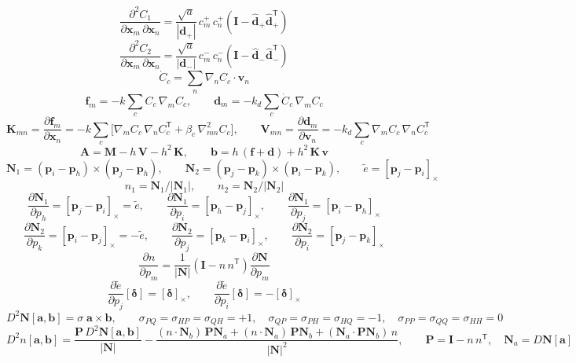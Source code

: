 \[ \frac{\partial^2 C_{1}}{\partial \mathbf{x}_m\,\partial \mathbf{x}_n} = \frac{\sqrt{a}}{|\mathbf{d}_{+}|}\,c^{{+}}_{m}\,c^{{+}}_{n}\left(\mathbf{I} - \hat{\mathbf{d}}_{+}\hat{\mathbf{d}}_{+}^{\mathsf T}\right) \]
\[ \frac{\partial^2 C_{2}}{\partial \mathbf{x}_m\,\partial \mathbf{x}_n} = \frac{\sqrt{a}}{|\mathbf{d}_{-}|}\,c^{{-}}_{m}\,c^{{-}}_{n}\left(\mathbf{I} - \hat{\mathbf{d}}_{-}\hat{\mathbf{d}}_{-}^{\mathsf T}\right) \]
\[ \dot C_c = \sum_n \nabla_n C_c\cdot\mathbf{v}_n \]
\[ \mathbf{f}_m = -k\sum_c C_c\,\nabla_m C_c,\qquad \mathbf{d}_m = -k_d\sum_c \dot C_c\,\nabla_m C_c \]
\[ \mathbf{K}_{mn} = \frac{\partial \mathbf{f}_m}{\partial \mathbf{x}_n} = -k\sum_c\Big[\nabla_m C_c\,\nabla_n C_c^{\mathsf T} + \beta_c\,\nabla^2_{mn} C_c\Big],\qquad \mathbf{V}_{mn} = \frac{\partial \mathbf{d}_m}{\partial \mathbf{v}_n} = -k_d\sum_c \nabla_m C_c\,\nabla_n C_c^{\mathsf T} \]
\[ \mathbf{A} = \mathbf{M} - h\,\mathbf{V} - h^2\,\mathbf{K},\qquad \mathbf{b} = h\,(\mathbf{f} + \mathbf{d}) + h^2\,\mathbf{K}\,\mathbf{v} \]
\[ \mathbf{N}_1 = (\mathbf{p}_i - \mathbf{p}_h)\times(\mathbf{p}_j - \mathbf{p}_h),\qquad \mathbf{N}_2 = (\mathbf{p}_j - \mathbf{p}_k)\times(\mathbf{p}_i - \mathbf{p}_k),\qquad \tilde{e} = [\mathbf{p}_j - \mathbf{p}_i]_\times \]
\[ n_1 = \mathbf{N}_1/|\mathbf{N}_1|,\qquad n_2 = \mathbf{N}_2/|\mathbf{N}_2| \]
\[ \frac{\partial \mathbf{N}_1}{\partial p_h} = [\mathbf{p}_j - \mathbf{p}_i]_\times = \tilde{e},\qquad \frac{\partial \mathbf{N}_1}{\partial p_i} = [\mathbf{p}_h - \mathbf{p}_j]_\times,\qquad \frac{\partial \mathbf{N}_1}{\partial p_j} = [\mathbf{p}_i - \mathbf{p}_h]_\times \]
\[ \frac{\partial \mathbf{N}_2}{\partial p_k} = [\mathbf{p}_i - \mathbf{p}_j]_\times = -\tilde{e},\qquad \frac{\partial \mathbf{N}_2}{\partial p_j} = [\mathbf{p}_k - \mathbf{p}_i]_\times,\qquad \frac{\partial \mathbf{N}_2}{\partial p_i} = [\mathbf{p}_j - \mathbf{p}_k]_\times \]
\[ \frac{\partial n}{\partial p_m} = \frac{1}{|\mathbf{N}|}\left(\mathbf{I} - n\,n^{\mathsf T}\right)\frac{\partial \mathbf{N}}{\partial p_m} \]
\[ \frac{\partial \tilde{e}}{\partial p_j}[\boldsymbol\delta] = [\boldsymbol\delta]_\times,\qquad \frac{\partial \tilde{e}}{\partial p_i}[\boldsymbol\delta] = -[\boldsymbol\delta]_\times \]
\[ D^2\mathbf{N}[\mathbf{a}, \mathbf{b}] = \sigma\;\mathbf{a}\times\mathbf{b},\qquad \sigma_{PQ} = \sigma_{HP} = \sigma_{QH} = +1,\quad \sigma_{QP} = \sigma_{PH} = \sigma_{HQ} = -1,\quad \sigma_{PP} = \sigma_{QQ} = \sigma_{HH} = 0 \]
\[ D^2 n[\mathbf{a}, \mathbf{b}] = \frac{\mathbf{P}\,D^2\mathbf{N}[\mathbf{a}, \mathbf{b}]}{|\mathbf{N}|} - \frac{(n\cdot \mathbf{N}_b)\,\mathbf{P}\mathbf{N}_a + (n\cdot \mathbf{N}_a)\,\mathbf{P}\mathbf{N}_b + (\mathbf{N}_a\cdot\mathbf{P}\mathbf{N}_b)\,n}{|\mathbf{N}|^2},\qquad \mathbf{P} = \mathbf{I} - n\,n^{\mathsf T},\quad \mathbf{N}_a = D\mathbf{N}[\mathbf{a}] \]
